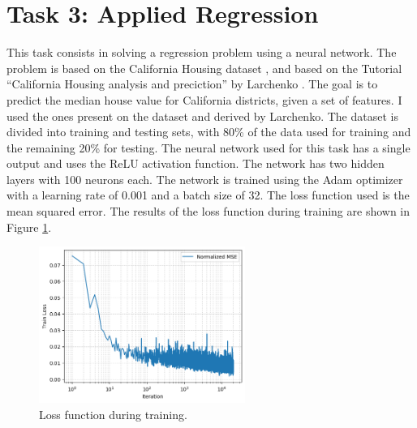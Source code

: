 \documentclass[unicode,11pt,a4paper,oneside,numbers=endperiod,openany]{scrartcl}
\begin{document}
\section{Task 3: Applied Regression}
This task consists in solving a regression problem using a neural network. The
problem is based on the California Housing dataset \cite{wang_california_housing_1990}, and based on the Tutorial
``California Housing analysis and preciction'' by Larchenko \cite{Larchenko2019}
. The goal is to predict the
median house value for California districts, given a set of features. I used the
ones present on the dataset and derived by Larchenko. The
dataset is divided into training and testing sets, with 80\% of the data used
for training and the remaining 20\% for testing. The neural network used for
this task has a single output and uses the ReLU activation function. The network
has two hidden layers with 100 neurons each. The network is trained using the
Adam optimizer with a learning rate of 0.001 and a batch size of 32. The loss
function used is the mean squared error. 
The results of the loss function during training are shown in Figure \ref{fig:task3_loss}.
\begin{figure}[h]
    \centering
    \includegraphics[width=0.6\textwidth]{../Proj1_Y24/Task3/loss.png}
    \caption{Loss function during training.}
    \label{fig:task3_loss}
\end{figure}




\end{document}
